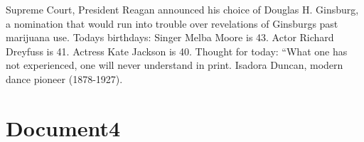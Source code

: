 \documentclass{article}
\begin{document}
Supreme Court, President Reagan announced his choice of \color[rgb]{0.27058823529411763,0.592156862745098,0.10980392156862745}Douglas H. Ginsburg, a nomination that would run into \color[rgb]{0.3215686274509804,0.00784313725490196,0.6549019607843137}trouble over revelations of Ginsburgs past marijuana use. \color[rgb]{0.27058823529411763,0.592156862745098,0.10980392156862745}Todays birthdays: Singer Melba Moore is 43. Actor Richard Dreyfuss is 41. Actress Kate \color[rgb]{0.9764705882352941,0.12941176470588237,0.24313725490196078}Jackson is 40. \color[rgb]{0.27058823529411763,0.592156862745098,0.10980392156862745}Thought for today: ``What one has not experienced, one will never understand in print.  Isadora Duncan, modern dance pioneer (1878-1927). 

\color[rgb]{0,0,0}\section{Document4}
\end{document}
